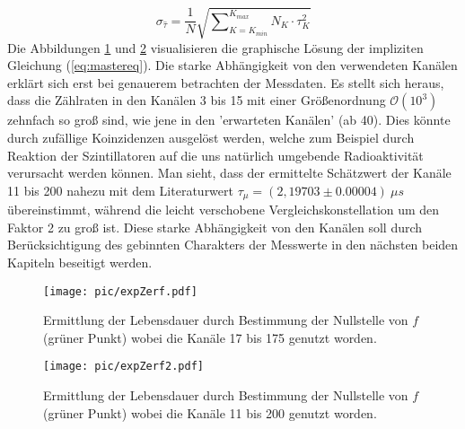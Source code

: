 		\begin{equation} 
			\sigma_{\hat{\tau}} = \frac{1}{N}\sqrt{\sum\nolimits_{K=K_{min}}^{K_{max}} N_K\cdot \tau_K^2}
		\end{equation}	
	Die Abbildungen \ref{fig:LDexpZerf1} und \ref{fig:LDexpZerf2} visualisieren die graphische Lösung der impliziten Gleichung (\ref{eq:mastereq}). Die starke Abhängigkeit von den verwendeten Kanälen erklärt sich erst bei genauerem betrachten der Messdaten. Es stellt sich heraus, dass die Zählraten in den Kanälen 3 bis 15  mit einer Größenordnung $\mathcal{O}(10^3)$ zehnfach so groß sind, wie jene in den 'erwarteten Kanälen' (ab 40). Dies könnte durch zufällige Koinzidenzen ausgelöst werden, welche zum Beispiel durch Reaktion der Szintillatoren auf die uns natürlich umgebende Radioaktivität verursacht werden können. Man sieht, dass der ermittelte Schätzwert der Kanäle 11 bis 200 nahezu mit dem Literaturwert $\tau_\mu = (2,19703 \pm 0.00004)\ \unit{\mu s}$\cite{PA} übereinstimmt, während die leicht verschobene Vergleichskonstellation um den Faktor 2 zu groß ist. Diese starke Abhängigkeit von den Kanälen soll durch Berücksichtigung des gebinnten Charakters der Messwerte in den nächsten beiden Kapiteln beseitigt werden. \\
		\begin{figure}[Hp]
		    \centering
		    \captionsetup{justification=centering}
		    \texttt{[image: pic/expZerf.pdf]}
			\caption{Ermittlung der Lebensdauer durch Bestimmung der Nullstelle von $f$ (grüner Punkt) wobei die Kanäle 17 bis 175 genutzt worden.}
			\label{fig:LDexpZerf1}
		\end{figure}	
		
		\begin{figure}[Hp]
			\centering
			\captionsetup{justification=centering}
		    \texttt{[image: pic/expZerf2.pdf]}
		    \caption{Ermittlung der Lebensdauer durch Bestimmung der Nullstelle von $f$ (grüner Punkt) wobei die Kanäle 11 bis 200 genutzt worden.}
		    \label{fig:LDexpZerf2}
		\end{figure}
			
